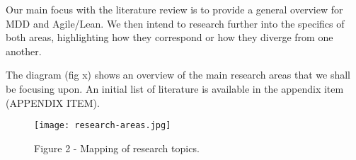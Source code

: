 \documentclass[ProjectPlan_innit.tex]{subfiles}
\begin{document}
Our main focus with the literature review is to provide a general overview for MDD and Agile/Lean. We then intend to research further into the specifics of both areas, highlighting how they correspond or how they diverge from one another. 

\hspace{0pt} 
The diagram (fig x) shows an overview of the main research areas that we shall be focusing upon. An initial list of literature is available in the appendix item (APPENDIX ITEM).
\hspace{0pt}



\begin{figure*}[H!]
  \texttt{[image: research-areas.jpg]}
  \caption{Figure 2 - Mapping of research topics.}
  \label{BBB}
\end{figure*}
\end{document}
